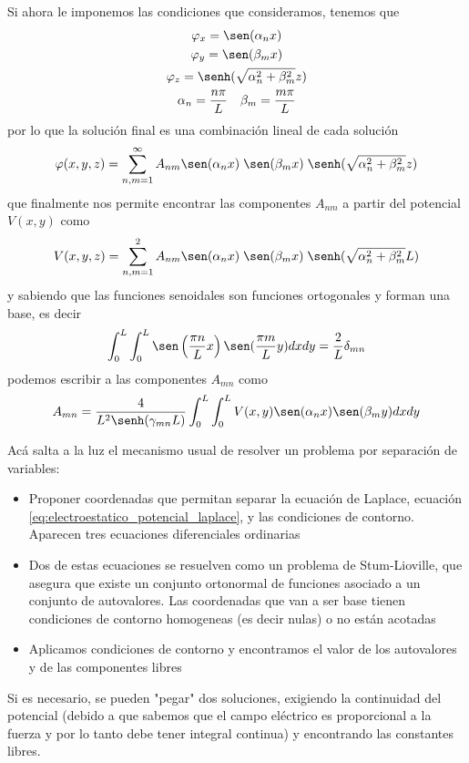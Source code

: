 \documentclass[a4paper]{article}
\numberwithin{equation}{section} %
\begin{document}
Si ahora le imponemos las condiciones que consideramos, tenemos que
\begin{equation}
  \begin{gathered}
    \varphi_{x} = \sen(\alpha_n x)\\
    \varphi_y = \sen(\beta_m x)\\
    \varphi_z = \senh(\sqrt{\alpha_n^2 + \beta_m^2} z)\\
    \alpha_n = \frac{n \pi}{L} \quad \beta_m = \frac{m \pi}{L}
  \end{gathered}
\end{equation}
por lo que la solución final es una combinación lineal de cada solución
\begin{equation}
  \varphi(x, y, z) = \sum^\infty_{n, m = 1} A_{nm} \sen(\alpha_n x)\; \sen(\beta_m x)\; \senh(\sqrt{\alpha_n^2 + \beta_m^2} z)
\end{equation}
que finalmente nos permite encontrar las componentes $A_{nm}$ a partir del potencial $V(x,y)$ como
\begin{equation}
  V(x, y, z) = \sum^2_{n, m = 1} A_{nm} \sen(\alpha_n x)\; \sen(\beta_m x)\; \senh(\sqrt{\alpha_n^2 + \beta_m^2} L)
\end{equation}
y sabiendo que las funciones senoidales son funciones ortogonales y forman una base, es decir
\begin{equation}
  \int_{0}^{L} \int_{0}^{L} \sen\left(\frac{\pi n}{L} x\right) \sen(\frac{\pi m}{L} y) dx dy = \frac{2}{L} \delta_{mn}
\end{equation}
podemos escribir a las componentes $A_{mn}$ como
\begin{equation}
  A_{mn} = \frac{4}{L^2 \senh(\gamma_{mn} L)}\int_{0}^{L} \int_{0}^{L} V(x, y) \sen(\alpha_n x) \sen(\beta_m y) dx dy
\end{equation}

Acá salta a la luz el mecanismo usual de resolver un problema por separación de variables:
\begin{itemize}
  \item{Proponer coordenadas que permitan separar la ecuación de Laplace, ecuación \ref{eq:electroestatico_potencial_laplace}, y las condiciones de contorno. Aparecen tres ecuaciones diferenciales ordinarias}
  \item{Dos de estas ecuaciones se resuelven como un problema de Stum-Lioville, que asegura que existe un conjunto ortonormal de funciones asociado a un conjunto de autovalores. Las coordenadas que van a ser base tienen condiciones de contorno homogeneas (es decir nulas) o no están acotadas}
  \item{Aplicamos condiciones de contorno y encontramos el valor de los autovalores y de las componentes libres}
\end{itemize}
Si es necesario, se pueden "pegar" dos soluciones, exigiendo la continuidad del potencial (debido a que sabemos que el campo eléctrico es proporcional a la fuerza y por lo tanto debe tener integral continua) y encontrando las constantes libres. 
\end{document}

